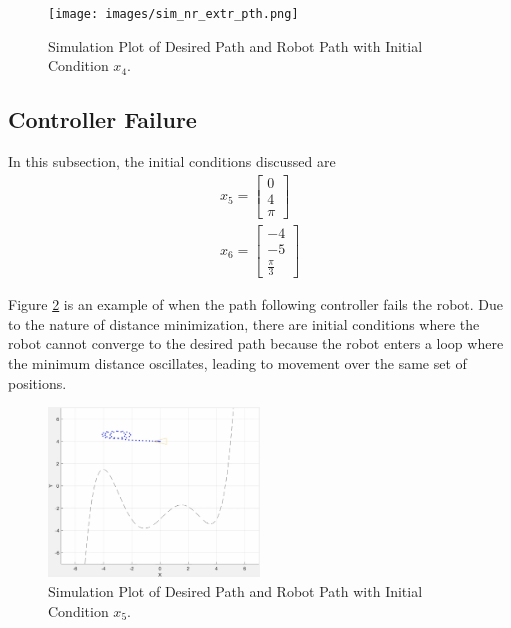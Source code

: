 \documentclass[11pt, letterpaper]{article}
\numberwithin{equation}{section}
\begin{document}
\begin{figure}[H]
	\begin{center}
		\texttt{[image: images/sim\_nr\_extr\_pth.png]}
		\caption{Simulation Plot of Desired Path and Robot Path with Initial Condition $x_4$.}
		\label{fig:sim_nr_extr_pth}
	\end{center}
\end{figure}

\subsection{Controller Failure}

In this subsection, the initial conditions discussed are
\begin{gather}
    x_5 = \begin{bmatrix} 0 \\ 4 \\ \pi \end{bmatrix} \\
    x_6 = \begin{bmatrix} -4 \\ -5 \\ \frac{\pi}{3} \end{bmatrix}
\end{gather}

Figure \ref{fig:sim_tp_cent} is an example of when the path following controller fails the robot. Due to the nature of distance minimization, there are initial conditions where the robot cannot converge to the desired path because the robot enters a loop where the minimum distance oscillates, leading to movement over the same set of positions.

\begin{figure}[H]
	\begin{center}
		\includegraphics[height=0.3\textheight, width=0.5\textwidth]{images/sim_tp_cent.png}
		\caption{Simulation Plot of Desired Path and Robot Path with Initial Condition $x_5$.}
		\label{fig:sim_tp_cent}
	\end{center}
\end{figure}
\end{document}
